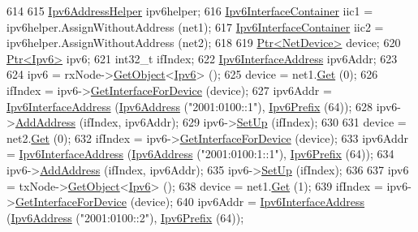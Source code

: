 \begin{DoxyCode}
614 
615   \hyperlink{classns3_1_1Ipv6AddressHelper}{Ipv6AddressHelper} ipv6helper;
616   \hyperlink{classns3_1_1Ipv6InterfaceContainer}{Ipv6InterfaceContainer} iic1 = ipv6helper.AssignWithoutAddress (net1);
617   \hyperlink{classns3_1_1Ipv6InterfaceContainer}{Ipv6InterfaceContainer} iic2 = ipv6helper.AssignWithoutAddress (net2);
618 
619   \hyperlink{classns3_1_1Ptr}{Ptr<NetDevice>} device;
620   \hyperlink{classns3_1_1Ptr}{Ptr<Ipv6>} ipv6;
621   int32\_t ifIndex;
622   \hyperlink{classns3_1_1Ipv6InterfaceAddress}{Ipv6InterfaceAddress} ipv6Addr;
623 
624   ipv6 = rxNode->\hyperlink{classns3_1_1Object_a13e18c00017096c8381eb651d5bd0783}{GetObject}<\hyperlink{classns3_1_1Ipv6}{Ipv6}> ();
625   device = net1.\hyperlink{classns3_1_1NetDeviceContainer_a677d62594b5c9d2dea155cc5045f4d0b}{Get} (0);
626   ifIndex = ipv6->\hyperlink{classns3_1_1Ipv6_a3337dc6ce66612b0fa9b57f7f0338745}{GetInterfaceForDevice} (device);
627   ipv6Addr = \hyperlink{classns3_1_1Ipv6InterfaceAddress}{Ipv6InterfaceAddress} (\hyperlink{classns3_1_1Ipv6Address}{Ipv6Address} (\textcolor{stringliteral}{"2001:0100::1"}), 
      \hyperlink{classns3_1_1Ipv6Prefix}{Ipv6Prefix} (64));
628   ipv6->\hyperlink{classns3_1_1Ipv6_a5cd576e83cf65445be3a0b5ffd1ddc5c}{AddAddress} (ifIndex, ipv6Addr);
629   ipv6->\hyperlink{classns3_1_1Ipv6_a8e61d85ec7fd342ed38fef2d040ed1b9}{SetUp} (ifIndex);
630 
631   device = net2.\hyperlink{classns3_1_1NetDeviceContainer_a677d62594b5c9d2dea155cc5045f4d0b}{Get} (0);
632   ifIndex = ipv6->\hyperlink{classns3_1_1Ipv6_a3337dc6ce66612b0fa9b57f7f0338745}{GetInterfaceForDevice} (device);
633   ipv6Addr = \hyperlink{classns3_1_1Ipv6InterfaceAddress}{Ipv6InterfaceAddress} (\hyperlink{classns3_1_1Ipv6Address}{Ipv6Address} (\textcolor{stringliteral}{"2001:0100:1::1"}), 
      \hyperlink{classns3_1_1Ipv6Prefix}{Ipv6Prefix} (64));
634   ipv6->\hyperlink{classns3_1_1Ipv6_a5cd576e83cf65445be3a0b5ffd1ddc5c}{AddAddress} (ifIndex, ipv6Addr);
635   ipv6->\hyperlink{classns3_1_1Ipv6_a8e61d85ec7fd342ed38fef2d040ed1b9}{SetUp} (ifIndex);
636 
637   ipv6 = txNode->\hyperlink{classns3_1_1Object_a13e18c00017096c8381eb651d5bd0783}{GetObject}<\hyperlink{classns3_1_1Ipv6}{Ipv6}> ();
638   device = net1.\hyperlink{classns3_1_1NetDeviceContainer_a677d62594b5c9d2dea155cc5045f4d0b}{Get} (1);
639   ifIndex = ipv6->\hyperlink{classns3_1_1Ipv6_a3337dc6ce66612b0fa9b57f7f0338745}{GetInterfaceForDevice} (device);
640   ipv6Addr = \hyperlink{classns3_1_1Ipv6InterfaceAddress}{Ipv6InterfaceAddress} (\hyperlink{classns3_1_1Ipv6Address}{Ipv6Address} (\textcolor{stringliteral}{"2001:0100::2"}), 
      \hyperlink{classns3_1_1Ipv6Prefix}{Ipv6Prefix} (64));

\end{DoxyCode}
